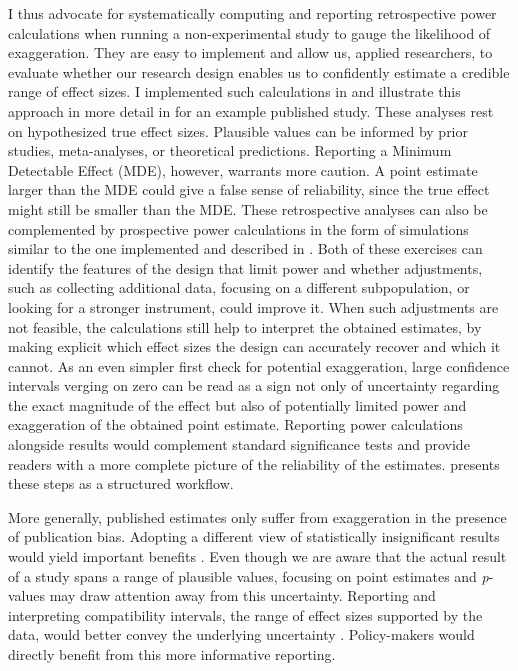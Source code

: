 \documentclass[12pt]{article}
\begin{document}
	I thus advocate for systematically computing and reporting retrospective power calculations when running a non-experimental study to gauge the likelihood of exaggeration. They are easy to implement and allow us, applied researchers, to evaluate whether our research design enables us to confidently estimate a credible range of effect sizes. I implemented such calculations in  and illustrate this approach in more detail in  for an example published study. These analyses rest on hypothesized true effect sizes. Plausible values can be informed by prior studies, meta-analyses, or theoretical predictions. Reporting a Minimum Detectable Effect (MDE), however, warrants more caution. A point estimate larger than the MDE could give a false sense of reliability, since the true effect might still be smaller than the MDE. These retrospective analyses can also be complemented by prospective power calculations in the form of simulations similar to the one implemented and described in . Both of these exercises can identify the features of the design that limit power and whether adjustments, such as collecting additional data, focusing on a different subpopulation, or looking for a stronger instrument, could improve it. When such adjustments are not feasible, the calculations still help to interpret the obtained estimates, by making explicit which effect sizes the design can accurately recover and which it cannot. As an even simpler first check for potential exaggeration, large confidence intervals verging on zero can be read as a sign not only of uncertainty regarding the exact magnitude of the effect but also of potentially limited power and exaggeration of the obtained point estimate. Reporting power calculations alongside results would complement standard significance tests and provide readers with a more complete picture of the reliability of the estimates.  presents these steps as a structured workflow. 
	
	More generally, published estimates only suffer from exaggeration in the presence of publication bias. Adopting a different view of statistically insignificant results would yield important benefits \citep{ziliak_cult_2008, wasserstein_asa_2016, mcshane_abandon_2019}. %
	Even though we are aware that the actual result of a study spans a range of plausible values, focusing on point estimates and \textit{p}-values may draw attention away from this uncertainty. Reporting and interpreting compatibility intervals, the range of effect sizes supported by the data, would better convey the underlying uncertainty \citep{amrhein_inferential_2019, romer_praise_2020}. Policy-makers would directly benefit from this more informative reporting.
	
\end{document}
